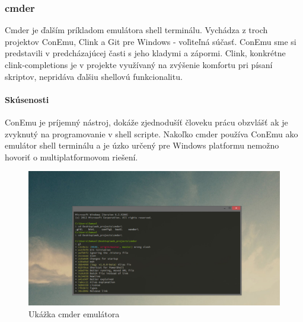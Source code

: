 \subsubsection{cmder}
\indent Cmder je ďalším príkladom emulátora shell terminálu. Vychádza z troch projektov ConEmu, Clink a Git pre Windows - voľiteľná súčasť. ConEmu sme si predstavili v predcházajúcej časti s jeho kladymi a zápormi. Clink, konkrétne clink-completions je v projekte využívaný na zvýšenie komfortu pri písaní skriptov, nepridáva ďalšiu shellovú funkcionalitu. 
\paragraph{Skúsenosti}
\indent ConEmu je príjemný nástroj, dokáže zjednodušíť človeku prácu obzvlášť ak je zvyknutý na programovanie v shell scripte. Nakoľko cmder používa ConEmu ako emulátor shell terminálu a je úzko určený pre Windows platformu nemožno hovoriť o multiplatformovom riešení.
\begin{figure}[!htbp]
	\centering
	\includegraphics[scale=0.3]{img/cmder.jpg}
	\caption{Ukážka cmder emulátora}
	\label{fig:test}
\end{figure}
\newpage
